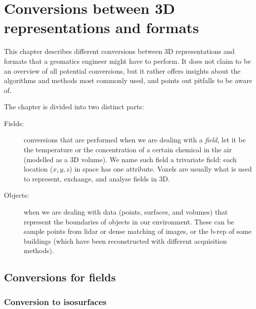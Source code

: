 
\setchapterpreamble[u]{\margintoc}

\graphicspath{{conversion/}}

\chapter{Conversions between 3D representations and formats}%
\label{chap:conversion}

This chapter describes different conversions between 3D representations and formats that a geomatics engineer might have to perform.
It does not claim to be an overview of all potential conversions, but it rather offers insights about the algorithms and methods most commonly used, and points out pitfalls to be aware of.


The chapter is divided into two distinct parts:
\begin{description}
  \item[Fields:] conversions that are performed when we are dealing with a \emph{field}, let it be the temperature or the concentration of a certain chemical in the air (modelled as a 3D volume).
  We name such field a trivariate field: each location ($x,y,z$) in space has one attribute.%
  Voxels are usually what is used to represent, exchange, and analyse fields in 3D.%
  \item[Objects:] when we are dealing with data (points, surfaces, and volumes) that represent the boundaries of objects in our environment. 
  These can be sample points from lidar or dense matching of images, or the b-rep of some buildings (which have been reconstructed with different acquisition methods).%
\end{description}

%
\section{Conversions for fields}

\subsection{Conversion to isosurfaces}

